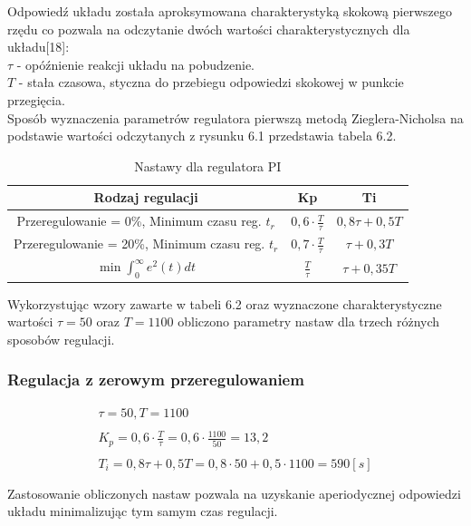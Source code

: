 \documentclass[oneside]{mgr}
\begin{document}
Odpowiedź układu została aproksymowana charakterystyką skokową pierwszego rzędu co pozwala na odczytanie dwóch wartości charakterystycznych dla układu[18]:\\
$\tau$ - opóźnienie reakcji układu na pobudzenie. \\
$T$ - stała czasowa, styczna do przebiegu odpowiedzi skokowej w punkcie przegięcia.\\

Sposób wyznaczenia parametrów regulatora pierwszą metodą Zieglera-Nicholsa na podstawie wartości odczytanych z rysunku 6.1 przedstawia tabela 6.2.

\begin{table}[h!]
\begin{tabularx}{\textwidth}{|c|c|c|}
\hline
\rowcolor{lightgray}
Rodzaj regulacji & Kp & Ti \\ \hline
\multirow{2}{*}{Przeregulowanie = 0\%,  Minimum czasu reg. $t_r$ } & \multirow{2}{*}{$0,6 \cdot \frac{T}{\tau}$} & \multirow{2}{*}{$0,8\tau + 0,5T$} \\
 & &\\\hline
\multirow{2}{*}{Przeregulowanie = 20\%,  Minimum czasu reg. $t_r$ } & \multirow{2}{*}{$0,7 \cdot \frac{T}{\tau}$} & \multirow{2}{*}{$\tau + 0,3T$} \\
 & &\\ \hline
\multirow{2}{*}{$\min \int_{0}^{\infty}e^{2}(t)dt$} & \multirow{2}{*}{$\frac{T}{\tau}$} & \multirow{2}{*}{$\tau + 0,35T$} \\
 & &\\ \hline
\end{tabularx}
   \caption{Nastawy dla regulatora PI}
\end{table}

Wykorzystując wzory zawarte w tabeli 6.2 oraz wyznaczone charakterystyczne wartości $\tau = 50$ oraz $T = 1100$ obliczono parametry nastaw dla trzech różnych sposobów regulacji.

\subsubsection{Regulacja z zerowym przeregulowaniem}
    \begin{equation*}
    \begin{array}{c}
     \tau = 50, T = 1100 \\ \\
    K_{p} = 0,6 \cdot \frac{T}{\tau} = 0,6 \cdot \frac{1100}{50} = 13,2 \\ \\
    T_{i} = 0,8\tau + 0,5T = 0,8 \cdot 50 + 0,5 \cdot 1100 = 590[s]\\ \\
    \end{array}
    \end{equation*}
    Zastosowanie obliczonych nastaw pozwala na uzyskanie aperiodycznej odpowiedzi układu minimalizując tym samym czas regulacji.
\end{document}
